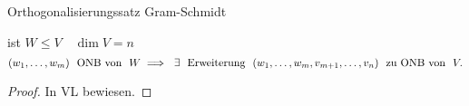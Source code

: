 \documentclass[class=article, crop=false]{standalone}
\begin{document}
\begin{zettel}{Orthogonalisierungssatz Gram-Schmidt}
\begin{flashcard}
    \begin{theorem}
    ist $W \leq V \quad \dim V = n$
\[
    (w_1,\dots, w_m)  \tx{ ONB von } W \implies \exists \tx{ Erweiterung } (w_1, \dots, w_m, v_{m+1}, \dots , v_n ) \tx{ zu ONB von } V
.\]
    \end{theorem}
\end{flashcard}

\begin{proof}
In VL bewiesen.
\end{proof}
\end{zettel}
\end{document}
